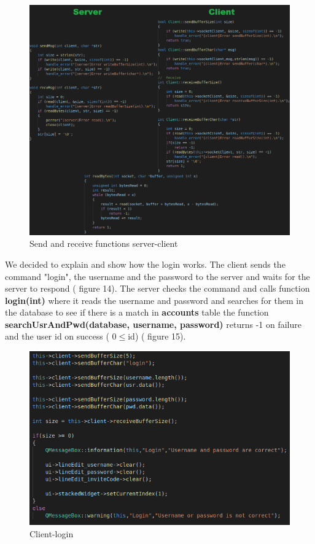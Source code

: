 \documentclass[runningheads]{llncs}
\begin{document}
\begin{figure}[H]
\includegraphics[width=\textwidth,height=\textheight,keepaspectratio]{images/sendRecv.png}
\caption{Send and receive functions server-client}
\end{figure}

\newpage 
\par We decided to explain and show how the login works. The client sends the command "login", the username and the password to the server and waits for the server to respond ( figure 14). The server checks the command and calls function \textbf{login(int)} where it reads the username and password and searches for them in the database to see if there is a match in \textbf{accounts} table the function \textbf{searchUsrAndPwd(database, username, password)} returns -1 on failure and the user id on success ( 0$\leq$id) ( figure 15).

\begin{figure}[H]
\includegraphics[]{images/client-login.png}
\caption{Client-login}
\end{figure}
\end{document}
